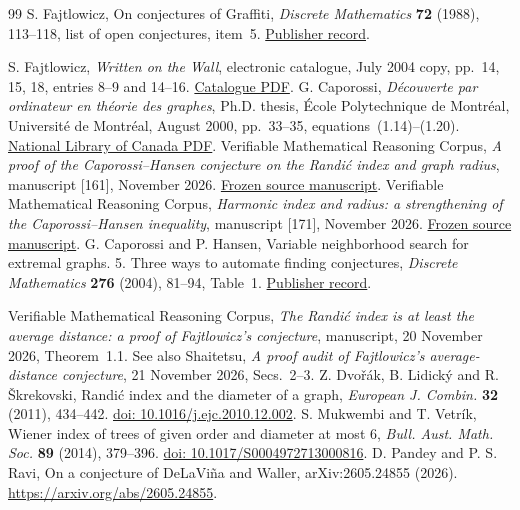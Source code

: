 \documentclass[11pt,a4paper]{article}
\newcommand{\doi}[1]{\href{https://doi.org/#1}{doi: #1}}
\begin{document}
\begin{thebibliography}{99}
 S. Fajtlowicz, On conjectures of Graffiti, \emph{Discrete Mathematics} \textbf{72} (1988), 113--118, list of open conjectures, item~5. \href{https://doi.org/10.1016/0012-365X(88)90199-9}{Publisher record}.

 S. Fajtlowicz, \emph{Written on the Wall}, electronic catalogue, July 2004 copy, pp.~14, 15, 18, entries 8--9 and 14--16. \href{https://independencenumber.wordpress.com/wp-content/uploads/2012/08/wow-july2004.pdf}{Catalogue PDF}.
 G. Caporossi, \emph{D\'ecouverte par ordinateur en th\'eorie des graphes}, Ph.D. thesis, \'Ecole Polytechnique de Montr\'eal, Universit\'e de Montr\'eal, August 2000, pp.~33--35, equations~(1.14)--(1.20). \href{https://www.collectionscanada.gc.ca/obj/s4/f2/dsk3/ftp05/NQ65536.pdf}{National Library of Canada PDF}.
 Verifiable Mathematical Reasoning Corpus, \emph{A proof of the Caporossi--Hansen conjecture on the Randi\'c index and graph radius}, manuscript [161], November 2026. \href{https://github.com/QEEDDD/Verifiable-Mathematical-Reasoning-Corpus/blob/884d261108a87d2229e5bcc273e5f4a607c771d2/\%5B161\%5D\%20Randic_Index_and_Vertex_Radius.tex}{Frozen source manuscript}.
 Verifiable Mathematical Reasoning Corpus, \emph{Harmonic index and radius: a strengthening of the Caporossi--Hansen inequality}, manuscript [171], November 2026. \href{https://github.com/QEEDDD/Verifiable-Mathematical-Reasoning-Corpus/blob/884d261108a87d2229e5bcc273e5f4a607c771d2/\%5B171\%5D\%20Harmonic_Radius_Master_Theorem.tex}{Frozen source manuscript}.
 G. Caporossi and P. Hansen, Variable neighborhood search for extremal graphs. 5. Three ways to automate finding conjectures, \emph{Discrete Mathematics} \textbf{276} (2004), 81--94, Table~1. \href{https://doi.org/10.1016/S0012-365X(03)00311-X}{Publisher record}.

 Verifiable Mathematical Reasoning Corpus, \emph{The Randi\'c index is at least the average distance: a proof of Fajtlowicz's conjecture}, manuscript, 20 November 2026, Theorem~1.1. See also Shaitetsu, \emph{A proof audit of Fajtlowicz's average-distance conjecture}, 21 November 2026, Secs.~2--3.
 Z. Dvořák, B. Lidický and R. Škrekovski, Randi\'c index and the diameter of a graph, \emph{European J. Combin.} \textbf{32} (2011), 434--442. \doi{10.1016/j.ejc.2010.12.002}.
 S. Mukwembi and T. Vetrík, Wiener index of trees of given order and diameter at most 6, \emph{Bull. Aust. Math. Soc.} \textbf{89} (2014), 379--396. \doi{10.1017/S0004972713000816}.
 D. Pandey and P. S. Ravi, On a conjecture of DeLaViña and Waller, arXiv:2605.24855 (2026). \url{https://arxiv.org/abs/2605.24855}.


\end{thebibliography}
\end{document}

